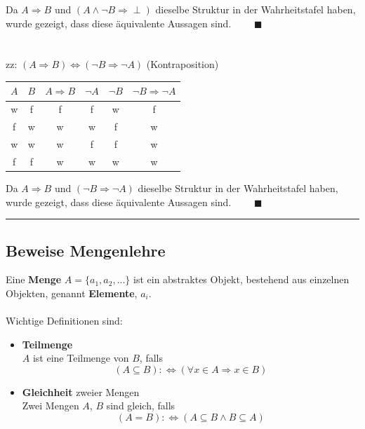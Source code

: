 \documentclass{article}
\begin{document}
{	Da $A \Rightarrow B$ und $(A \wedge \neg B \Rightarrow \perp)$ dieselbe Struktur in der Wahrheitstafel haben, wurde gezeigt, dass diese äquivalente Aussagen sind. $\qquad \blacksquare$\\
	\\
	\\
	zz: $(A \Rightarrow B) \Leftrightarrow (\neg B \Rightarrow \neg A)$ (Kontraposition)
		\begin{table}[h]
			\centering
			\begin{tabular}{c|c||c||c|c|c}
				\hline\hline
					$A$ & $B$ & $A \Rightarrow B$ & $\neg A$ & $\neg B$ & $\neg B \Rightarrow \neg A$ \\
				\hline
					w & f & f & f & w & f \\
					f & w & w & w & f & w \\
					w & w & w & f & f & w \\
					f & f & w & w & w & w \\
				\hline\hline
			\end{tabular}		
		\end{table}
	
	Da $A \Rightarrow B$ und $(\neg B \Rightarrow \neg A)$ dieselbe Struktur in der Wahrheitstafel haben, wurde gezeigt, dass diese äquivalente Aussagen sind. $\qquad \blacksquare$\\
\hrule
}


\newpage


\subsection*{Beweise Mengenlehre}
Eine \textbf{Menge} $A = \{a_1,a_2,...\}$ ist ein abstraktes Objekt, bestehend aus einzelnen Objekten, genannt \textbf{Elemente}, $a_i$.\\
\\
Wichtige Definitionen sind:
	\begin{itemize}
		\item \textbf{Teilmenge}\\
		$A$ ist eine Teilmenge von $B$, falls
			\begin{equation}
				(A \subseteq B) :\Leftrightarrow (\forall x \in A \Rightarrow x \in B)
			\end{equation}


		\item \textbf{Gleichheit} zweier Mengen\\
		Zwei Mengen $A$, $B$ sind gleich, falls
			\begin{equation}
				(A = B) :\Leftrightarrow (A \subseteq B \wedge B \subseteq A)
			\end{equation}
	\end{itemize}
\end{document}
